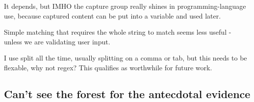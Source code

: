  It depends, but IMHO the capture group really shines in programming-language use, because captured content can be put into a variable and used later.

 Simple matching that requires the whole string to match seems less useful - unless we are validating user input.


 I use split all the time, usually splitting on a comma or tab, but this needs to be flexable, why not regex?  This qualifies as worthwhile for future work.

 \subsection{Can't see the forest for the antecdotal evidence}
